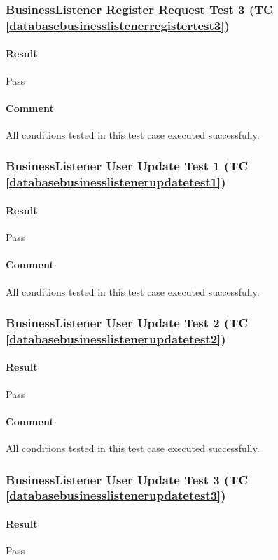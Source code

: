 \documentclass[hidelinks,english]{article}
\begin{document}
			\subsubsection{BusinessListener Register Request Test 3 (TC \ref{databasebusinesslistenerregistertest3})}
				\paragraph{Result} Pass
				\paragraph{Comment} All conditions tested in this test case executed successfully.
				
			\subsubsection{BusinessListener User Update Test 1 (TC \ref{databasebusinesslistenerupdatetest1})}
				\paragraph{Result} Pass
				\paragraph{Comment} All conditions tested in this test case executed successfully.
				
			\subsubsection{BusinessListener User Update Test 2 (TC \ref{databasebusinesslistenerupdatetest2})}
				\paragraph{Result} Pass
				\paragraph{Comment} All conditions tested in this test case executed successfully.
				
			\subsubsection{BusinessListener User Update Test 3 (TC \ref{databasebusinesslistenerupdatetest3})}
				\paragraph{Result} Pass
\end{document}
